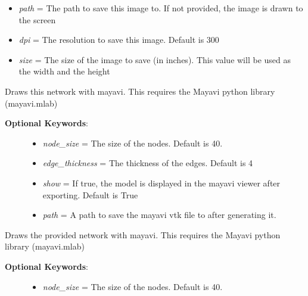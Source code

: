 \documentclass[a4paper,10pt,english]{sphinxmanual}
\begin{document}
\begin{fulllineitems}
\begin{fulllineitems}
\begin{description}
\begin{itemize}
\item {} 
\emph{path} = The path to save this image to. If not provided, the image is drawn to the screen

\item {} 
\emph{dpi} = The resolution to save this image. Default is 300

\item {} 
\emph{size} = The size of the image to save (in inches). This value will be used as the width and the height

\end{itemize}

\end{description}

\end{fulllineitems}


\begin{fulllineitems}
\label{pynoddy:pynoddy.output.NoddyTopology.draw_mayavi}
Draws this network with mayavi. This requires the Mayavi python library
(mayavi.mlab)
\begin{description}
\item[{\textbf{Optional Keywords}:}] \leavevmode\begin{itemize}
\item {} 
\emph{node\_size} = The size of the nodes. Default is 40.

\item {} 
\emph{edge\_thickness} = The thickness of the edges. Default is 4

\item {} 
\emph{show} = If true, the model is displayed in the mayavi viewer after exporting. Default is True

\item {} 
\emph{path} = A path to save the mayavi vtk file to after generating it.

\end{itemize}

\end{description}

\end{fulllineitems}


\begin{fulllineitems}
\label{pynoddy:pynoddy.output.NoddyTopology.draw_mayavi_graph}
Draws the provided network with mayavi. This requires the Mayavi python library
(mayavi.mlab)
\begin{description}
\item[{\textbf{Optional Keywords}:}] \leavevmode\begin{itemize}
\item {} 
\emph{node\_size} = The size of the nodes. Default is 40.


\end{itemize}
\end{description}
\end{fulllineitems}
\end{fulllineitems}
\end{document}
